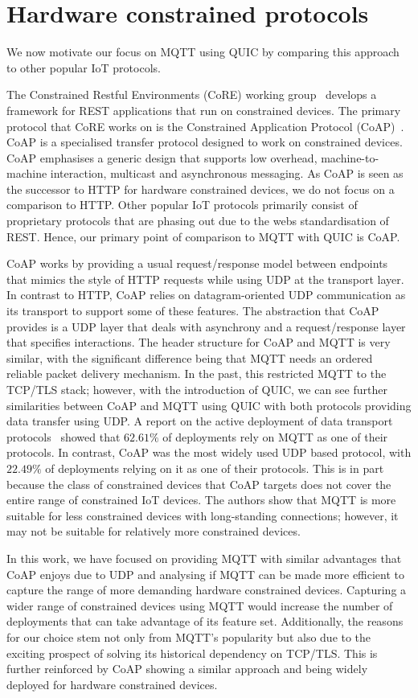 \section{Hardware constrained protocols} \label{sec:iot-protos}

We now motivate our focus on MQTT using QUIC by comparing this approach to other popular IoT protocols.

The Constrained Restful Environments (CoRE) working group~\citep{core_wg} develops a framework for REST applications that run on constrained devices.
The primary protocol that CoRE works on is the Constrained Application Protocol (CoAP)~\citep{Shelby2014}.
CoAP is a specialised transfer protocol designed to work on constrained devices.
CoAP emphasises a generic design that supports low overhead, machine-to-machine interaction, multicast and asynchronous messaging.
As CoAP is seen as the successor to HTTP for hardware constrained devices, we do not focus on a comparison to HTTP.
Other popular IoT protocols primarily consist of proprietary protocols that are phasing out due to the webs standardisation of REST.
Hence, our primary point of comparison to MQTT with QUIC is CoAP.

CoAP works by providing a usual request/response model between endpoints that mimics the style of HTTP requests while using UDP at the transport layer.
In contrast to HTTP, CoAP relies on datagram-oriented UDP communication as its transport to support some of these features.
The abstraction that CoAP provides is a UDP layer that deals with asynchrony and a request/response layer that specifies interactions.
The header structure for CoAP and MQTT is very similar, with the significant difference being that MQTT needs an ordered reliable packet delivery mechanism.
In the past, this restricted MQTT to the TCP/TLS stack; however, with the introduction of QUIC, we can see further similarities between CoAP and MQTT using QUIC with both protocols providing data transfer using UDP.
A report on the active deployment of data transport protocols~\cite{tmobile_iot} showed that $62.61\%$ of deployments rely on MQTT as one of their protocols.
In contrast, CoAP was the most widely used UDP based protocol, with $22.49\%$ of deployments relying on it as one of their protocols.
This is in part because the class of constrained devices that CoAP targets does not cover the entire range of constrained IoT devices.
The authors show that MQTT is more suitable for less constrained devices with long-standing connections; however, it may not be suitable for relatively more constrained devices.

In this work, we have focused on providing MQTT with similar advantages that CoAP enjoys due to UDP and analysing if MQTT can be made more efficient to capture the range of more demanding hardware constrained devices.
Capturing a wider range of constrained devices using MQTT would increase the number of deployments that can take advantage of its feature set.
Additionally, the reasons for our choice stem not only from MQTT's popularity but also due to the exciting prospect of solving its historical dependency on TCP/TLS.
This is further reinforced by CoAP showing a similar approach and being widely deployed for hardware constrained devices.
